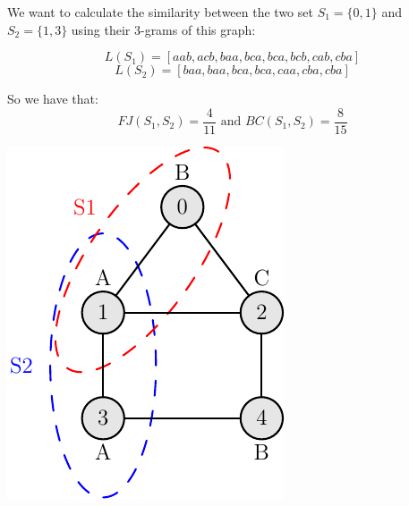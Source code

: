 \begin{minipage}{0.60\textwidth}\raggedright
	\begin{esempio}
	\end{esempio}
	
	We want to calculate the similarity between the two set $S_{1} = \{0,1\}$ and $S_{2} = \{1, 3\}$ using their $3$-grams of this graph:
	
	\begin{equation*}
	L(S_{1}) = [aab, acb, baa, bca, bca, bcb, cab, cba]
	\end{equation*}
	\begin{equation*}
	L(S_{2}) = [baa, baa, bca, bca, caa, cba, cba]
	\end{equation*}
	
	So we have that:
	\begin{equation*}
	FJ(S_{1}, S_{2}) = \frac{4}{11} \text{  and  } BC(S_{1}, S_{2}) = \frac{8}{15}
	\end{equation*}
\end{minipage}
\begin{minipage}{0.30\textwidth}
	\includegraphics[width=\linewidth]{figure/figure-2-1}
\end{minipage}

